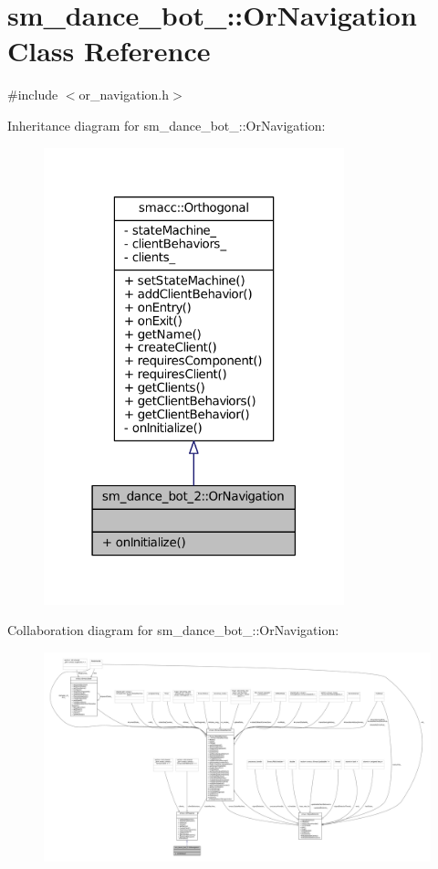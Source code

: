 \hypertarget{classsm__dance__bot__2_1_1OrNavigation}{}\section{sm\+\_\+dance\+\_\+bot\+\_\+:\+:Or\+Navigation Class Reference}
\label{classsm__dance__bot__2_1_1OrNavigation}


{\ttfamily \#include $<$or\+\_\+navigation.\+h$>$}



Inheritance diagram for sm\+\_\+dance\+\_\+bot\+\_\+:\+:Or\+Navigation\+:
\nopagebreak
\begin{figure}[H]
\begin{center}
\leavevmode
\includegraphics[width=247pt]{classsm__dance__bot__2_1_1OrNavigation__inherit__graph}
\end{center}
\end{figure}


Collaboration diagram for sm\+\_\+dance\+\_\+bot\+\_\+:\+:Or\+Navigation\+:
\nopagebreak
\begin{figure}[H]
\begin{center}
\leavevmode
\includegraphics[width=350pt]{classsm__dance__bot__2_1_1OrNavigation__coll__graph}
\end{center}
\end{figure}
